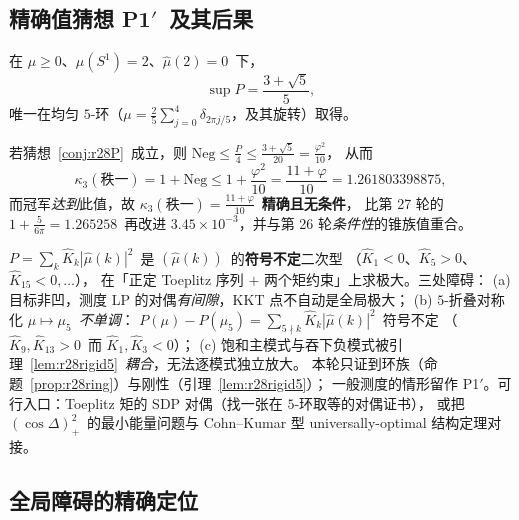 \subsection{精确值猜想 P1$'$~及其后果}\label{sec:r28:conj}

\begin{conjecture}[$P$~的精确上确界]\label{conj:r28P}
在 $\mu\ge0$、$\mu(S^1)=2$、$\widehat\mu(2)=0$~下，
\[
\sup P=\frac{3+\sqrt5}5,
\]
唯一在均匀 $5$-环（$\mu=\frac25\sum_{j=0}^4\delta_{2\pi j/5}$，及其旋转）取得。
\end{conjecture}

\begin{corollary}\label{cor:r28exact}
若猜想~\ref{conj:r28P}~成立，则 $\mathrm{Neg}\le\frac P4\le\frac{3+\sqrt5}{20}=\frac{\varphi^2}{10}$，
从而
\[
\kappa_3(\text{秩一})=1+\mathrm{Neg}\le1+\frac{\varphi^2}{10}=\frac{11+\varphi}{10}=1.261803398875,
\]
而冠军\emph{达到}此值，故 $\kappa_3(\text{秩一})=\frac{11+\varphi}{10}$~\textbf{精确且无条件}，
比第 27 轮的 $1+\frac5{6\pi}=1.265258$~再改进 $3.45\times10^{-3}$，并与第 26 轮\emph{条件性}的锥族值重合。
\end{corollary}

\begin{remark}\label{rem:r28hard}
$P=\sum_k\widehat K_k|\widehat\mu(k)|^2$~是 $(\widehat\mu(k))$~的\textbf{符号不定}二次型
（$\widehat K_1<0$、$\widehat K_5>0$、$\widehat K_{15}<0,\dots$），
在「正定 Toeplitz 序列 $+$ 两个矩约束」上求极大。三处障碍：
(a) 目标非凹，测度 LP 的对偶\emph{有间隙}，KKT 点不自动是全局极大；
(b) $5$-折叠对称化 $\mu\mapsto\mu_5$~\emph{不单调}：
$P(\mu)-P(\mu_5)=\sum_{5\nmid k}\widehat K_k|\widehat\mu(k)|^2$~符号不定
（$\widehat K_9,\widehat K_{13}>0$~而 $\widehat K_1,\widehat K_3<0$）；
(c) 饱和主模式与吞下负模式被引理~\ref{lem:r28rigid5}~\emph{耦合}，无法逐模式独立放大。
本轮只证到环族（命题~\ref{prop:r28ring}）与刚性（引理~\ref{lem:r28rigid5}）；
一般测度的情形留作 P1$'$。可行入口：Toeplitz 矩的 SDP 对偶（找一张在 $5$-环取等的对偶证书），
或把 $(\cos\Delta)_+^2$~的最小能量问题与 Cohn--Kumar 型 universally-optimal 结构定理对接。
\end{remark}

\subsection{全局障碍的精确定位}\label{sec:r28:global}

